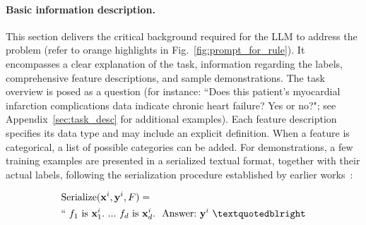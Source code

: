 \vspace*{-0.12in}
\paragraph{Basic information description.} This section delivers the critical background required for the LLM to address the problem (refer to orange highlights in Fig.~\ref{fig:prompt_for_rule}). It encompasses a clear explanation of the task, information regarding the labels, comprehensive feature descriptions, and sample demonstrations. The task overview is posed as a question (for instance: ``Does this patient's myocardial infarction complications data indicate chronic heart failure? Yes or no?"; see Appendix~\ref{sec:task_desc} for additional examples). Each feature description specifies its data type and may include an explicit definition. When a feature is categorical, a list of possible categories can be added. For demonstrations, a few training examples are presented in a serialized textual format, together with their actual labels, following the serialization procedure established by earlier works~\cite{dinh2022lift,hegselmann2023tabllm}:

\begin{align}
&\text{Serialize}(\mathbf{x}^i,\mathbf{y}^i, F) = \nonumber \\ 
&``\ f_1\ \text{is}\ \mathbf{x}^i_1.\ ... \ f_d\  \text{is}\  \mathbf{x}^i_d.\ \ \text{Answer:}\  \mathbf{y}^i\ ”
\end{align}

\vspace*{-0.12in}
